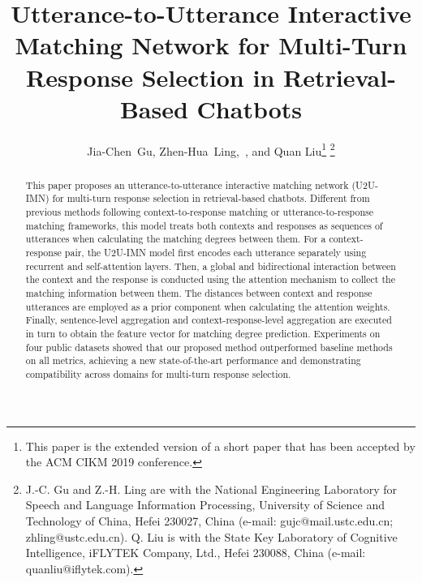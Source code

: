 \documentclass[journal]{IEEEtran}
\begin{document}
\title{Utterance-to-Utterance Interactive Matching Network for Multi-Turn Response Selection in Retrieval-Based Chatbots}


\author{Jia-Chen~Gu, Zhen-Hua~Ling,~, and Quan Liu\thanks{This paper is the extended version of a short paper \cite{Gu:2019:IMN:3357384.3358140} that has been accepted by the ACM CIKM 2019 conference.}
\thanks{J.-C. Gu and Z.-H. Ling are with the National Engineering Laboratory for Speech and Language Information Processing, University of Science and Technology of China, Hefei 230027, China (e-mail: gujc@mail.ustc.edu.cn; zhling@ustc.edu.cn). Q. Liu is with the State Key Laboratory of Cognitive Intelligence, iFLYTEK Company, Ltd., Hefei 230088, China (e-mail: quanliu@iflytek.com).}}



















\maketitle

\begin{abstract}
  This paper proposes an utterance-to-utterance interactive matching network (U2U-IMN) for multi-turn response selection in retrieval-based chatbots. Different from previous methods following context-to-response matching or utterance-to-response matching frameworks, this model treats both contexts and responses as sequences of utterances when calculating the matching degrees between them. For a context-response pair, the U2U-IMN model first encodes each utterance separately using recurrent and self-attention layers. Then, a global and bidirectional interaction between the context and the response is conducted using the attention mechanism to collect the matching information between them. The distances between context and response utterances are employed as a prior component when calculating the attention weights. Finally, sentence-level aggregation and context-response-level aggregation are executed in turn to obtain the feature vector for matching degree prediction. Experiments on four public datasets showed that our proposed method outperformed baseline methods on all metrics, achieving a new state-of-the-art performance and demonstrating compatibility across domains for multi-turn response selection.
\end{abstract}
\end{document}
